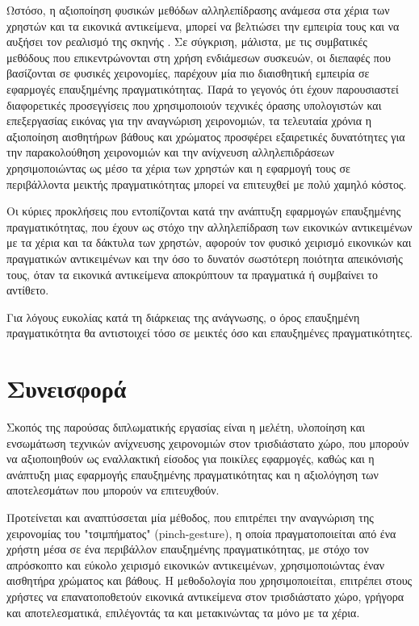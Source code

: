 Ωστόσο, η αξιοποίηση φυσικών μεθόδων αλληλεπίδρασης ανάμεσα στα χέρια των χρηστών και τα εικονικά αντικείμενα, μπορεί να βελτιώσει την εμπειρία τους και να αυξήσει τον ρεαλισμό της σκηνής \cite{Kato2000}.  Σε σύγκριση, μάλιστα, με τις συμβατικές μεθόδους που επικεντρώνονται στη χρήση ενδιάμεσων συσκευών, οι διεπαφές που βασίζονται σε φυσικές χειρονομίες, παρέχουν μία πιο διαισθητική εμπειρία σε εφαρμογές επαυξημένης πραγματικότητας. Παρά το γεγονός ότι έχουν παρουσιαστεί διαφορετικές προσεγγίσεις που χρησιμοποιούν τεχνικές όρασης υπολογιστών και επεξεργασίας εικόνας για την αναγνώριση χειρονομιών, τα τελευταία χρόνια η αξιοποίηση αισθητήρων βάθους και χρώματος προσφέρει εξαιρετικές δυνατότητες για την παρακολούθηση χειρονομιών και την ανίχνευση αλληλεπιδράσεων χρησιμοποιώντας ως μέσο τα χέρια των χρηστών και η εφαρμογή τους σε περιβάλλοντα μεικτής πραγματικότητας μπορεί να επιτευχθεί με πολύ χαμηλό κόστος.


Οι κύριες προκλήσεις που εντοπίζονται κατά την ανάπτυξη εφαρμογών επαυξημένης πραγματικότητας, που έχουν ως στόχο την αλληλεπίδραση των εικονικών αντικειμένων με τα χέρια και τα δάκτυλα των χρηστών, αφορούν τον φυσικό χειρισμό εικονικών και πραγματικών αντικειμένων και την όσο το δυνατόν σωστότερη ποιότητα απεικόνισής τους, όταν τα εικονικά αντικείμενα αποκρύπτουν τα πραγματικά ή συμβαίνει το αντίθετο. 


Για λόγους ευκολίας κατά τη διάρκειας της ανάγνωσης, ο όρος επαυξημένη πραγματικότητα θα αντιστοιχεί τόσο σε μεικτές όσο και επαυξημένες πραγματικότητες.



\section{Συνεισφορά}


Σκοπός της παρούσας διπλωματικής εργασίας είναι η μελέτη, υλοποίηση και ενσωμάτωση τεχνικών ανίχνευσης χειρονομιών στον τρισδιάστατο χώρο, που μπορούν να αξιοποιηθούν ως εναλλακτική είσοδος για ποικίλες εφαρμογές, καθώς και η ανάπτυξη μιας εφαρμογής επαυξημένης πραγματικότητας και η αξιολόγηση των αποτελεσμάτων που μπορούν να επιτευχθούν. 



Προτείνεται και αναπτύσσεται μία μέθοδος, που επιτρέπει την αναγνώριση της χειρονομίας του "τσιμπήματος" (pinch-gesture), η οποία πραγματοποιείται από ένα χρήστη μέσα σε ένα περιβάλλον επαυξημένης πραγματικότητας, με στόχο τον απρόσκοπτο και εύκολο χειρισμό εικονικών αντικειμένων, χρησιμοποιώντας έναν αισθητήρα χρώματος και βάθους. Η μεθοδολογία που χρησιμοποιείται, επιτρέπει στους χρήστες να επανατοποθετούν εικονικά αντικείμενα στον τρισδιάστατο χώρο, γρήγορα και αποτελεσματικά, επιλέγοντάς τα και μετακινώντας τα μόνο με τα χέρια.


